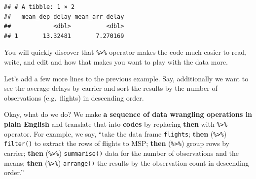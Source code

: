 \documentclass[]{book}
\newenvironment{Shaded}{\begin{snugshade}}{\end{snugshade}}
\newcommand{\KeywordTok}[1]{\textcolor[rgb]{0.13,0.29,0.53}{\textbf{{#1}}}}
\newcommand{\DataTypeTok}[1]{\textcolor[rgb]{0.13,0.29,0.53}{{#1}}}
\newcommand{\StringTok}[1]{\textcolor[rgb]{0.31,0.60,0.02}{{#1}}}
\newcommand{\CommentTok}[1]{\textcolor[rgb]{0.56,0.35,0.01}{\textit{{#1}}}}
\newcommand{\OtherTok}[1]{\textcolor[rgb]{0.56,0.35,0.01}{{#1}}}
\newcommand{\NormalTok}[1]{{#1}}
\theoremstyle{definition}
\theoremstyle{definition}
\theoremstyle{remark}
\begin{document}
\begin{verbatim}
## # A tibble: 1 × 2
##   mean_dep_delay mean_arr_delay
##            <dbl>          <dbl>
## 1       13.32481       7.270169
\end{verbatim}

You will quickly discover that \texttt{\%\textgreater{}\%} operator
makes the code much easier to read, write, and edit and how that makes
you want to play with the data more.

Let's add a few more lines to the previous example. Say, additionally we
want to see the average delays by carrier and sort the results by the
number of observations (e.g.~flights) in descending order.

Okay, what do we do? We make \textbf{a sequence of data wrangling
operations in plain English} and translate that into \textbf{codes} by
replacing \textbf{then} with \texttt{\%\textgreater{}\%} operator. For
example, we say, ``take the data frame \texttt{flights}; \textbf{then}
(\texttt{\%\textgreater{}\%}) \texttt{filter()} to extract the rows of
flights to MSP; \textbf{then} (\texttt{\%\textgreater{}\%}) group rows
by carrier; \textbf{then} (\texttt{\%\textgreater{}\%})
\texttt{summarise()} data for the number of observations and the means;
\textbf{then} (\texttt{\%\textgreater{}\%}) \texttt{arrange()} the
results by the observation count in descending order.''

\begin{Shaded}
\end{Shaded}
\end{document}
